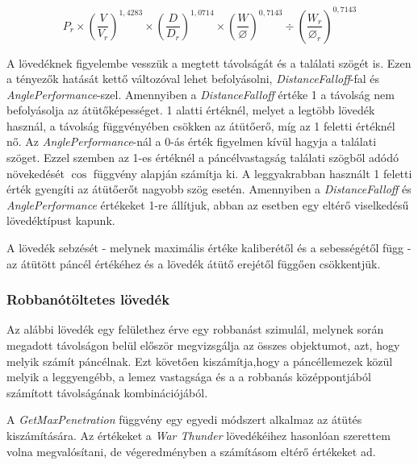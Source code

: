 \documentclass[
]{thesis-ekf}
\theoremstyle{definition}
\theoremstyle{remark}
\begin{document}
\begin{equation}
 P_r \times \left( \frac{V}{V_r}\right)^{1,4283} \times \left( \frac{D}{D_r} \right)^{1,0714}  \times \left(\frac{W}{\varnothing}\right)^{0,7143} \div \left(\frac{W_r}{\varnothing_r}\right)^{0,7143}
 \label{demarre}
\end{equation}


A lövedéknek figyelembe vesszük a megtett távolságát és a találati szögét is. Ezen a tényezők hatását kettő változóval lehet befolyásolni, \emph{DistanceFalloff}-fal és \emph{AnglePerformance}-szel. Amennyiben a \emph{DistanceFalloff} értéke 1 a távolság nem befolyásolja az átütőképességet. 1 alatti értéknél, melyet a legtöbb lövedék használ, a távolság függvényében csökken az átütőerő, míg az 1 feletti értéknél nő. Az \emph{AnglePerformance}-nál a 0-ás érték figyelmen kívül hagyja a találati szöget. Ezzel szemben az 1-es értéknél a páncélvastagság találati szögből adódó növekedését $\cos$ függvény alapján számítja ki. A leggyakrabban használt 1 feletti érték gyengíti az átütőerőt nagyobb szög esetén. Amennyiben a \emph{DistanceFalloff} és \emph{AnglePerformance} értékeket 1-re állítjuk, abban az esetben egy eltérő viselkedésű lövedéktípust kapunk.




A lövedék sebzését - melynek maximális értéke kaliberétől és a sebességétől függ - az átütött páncél értékéhez és a lövedék átütő erejétől függően csökkentjük.

\subsubsection{Robbanótöltetes lövedék}

Az alábbi lövedék egy felülethez érve egy robbanást szimulál, melynek során megadott távolságon belül először megvizsgálja az összes objektumot, azt, hogy melyik számít páncélnak. Ezt követően kiszámítja,hogy a páncéllemezek közül melyik a leggyengébb, a lemez vastagsága és a a robbanás középpontjából számított távolságának kombinációjából.



A \emph{GetMaxPenetration} függvény egy egyedi módszert alkalmaz az átütés kiszámítására. Az értékeket a \emph{War Thunder} lövedékéihez hasonlóan szerettem volna megvalósítani, de végeredményben a számításom eltérő értékeket ad.
\end{document}
